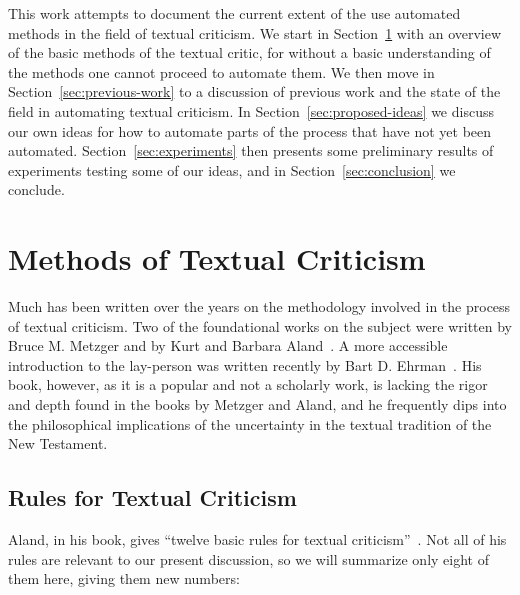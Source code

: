 \documentclass[onecolumn, 12pt]{article}
\newcommand{\secref}[1]{Section~\ref{sec:#1}}
\begin{document}
This work attempts to document the current extent of the use automated methods 
in the field of textual criticism.  We start in \secref{methods} with an
overview of the basic methods of the textual critic, for without a basic
understanding of the methods one cannot proceed to automate them.  We then move
in \secref{previous-work} to a discussion of previous work and the state of the
field in automating textual criticism.  In \secref{proposed-ideas} we discuss
our own ideas for how to automate parts of the process that have not yet been
automated.  \secref{experiments} then presents some preliminary results of
experiments testing some of our ideas, and in \secref{conclusion} we conclude.

\section{Methods of Textual Criticism}
\label{sec:methods}

Much has been written over the years on the methodology involved in the process
of textual criticism.  Two of the foundational works on the subject were
written by Bruce M. Metzger and by Kurt and Barbara
Aland~\cite{metzger-1992-text-of-the-new-testament,
aland-text-of-the-new-testament}.  A more accessible introduction to the
lay-person was written recently by Bart D.
Ehrman~\cite{ehrman-2005-misquoting-jesus}.  His book, however, as it is a
popular and not a scholarly work, is lacking the rigor and depth found in the
books by Metzger and Aland, and he frequently dips into the philosophical
implications of the uncertainty in the textual tradition of the New Testament.

\subsection{Rules for Textual Criticism}

Aland, in his book, gives ``twelve basic rules for textual
criticism''~\cite[280--282]{aland-text-of-the-new-testament}.  Not all of his
rules are relevant to our present discussion, so we will summarize only eight
of them here, giving them new numbers:
\end{document}
